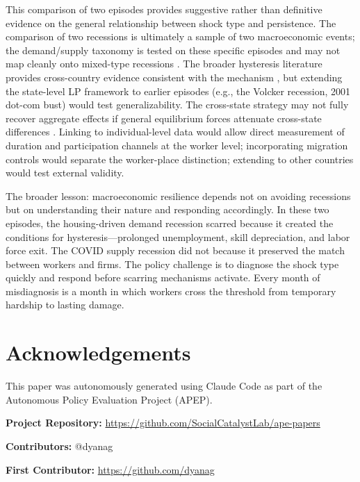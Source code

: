 \documentclass[12pt]{article}
\begin{document}
This comparison of two episodes provides suggestive rather than definitive evidence on the general relationship between shock type and persistence. The comparison of two recessions is ultimately a sample of two macroeconomic events; the demand/supply taxonomy is tested on these specific episodes and may not map cleanly onto mixed-type recessions \citep{guerrieri2022macroeconomic}. The broader hysteresis literature provides cross-country evidence consistent with the mechanism \citep{cerra2023hysteresis}, but extending the state-level LP framework to earlier episodes (e.g., the Volcker recession, 2001 dot-com bust) would test generalizability. The cross-state strategy may not fully recover aggregate effects if general equilibrium forces attenuate cross-state differences \citep{beraja2019geography}. Linking to individual-level data would allow direct measurement of duration and participation channels at the worker level; incorporating migration controls would separate the worker-place distinction; extending to other countries would test external validity.

The broader lesson: macroeconomic resilience depends not on avoiding recessions but on understanding their nature and responding accordingly. In these two episodes, the housing-driven demand recession scarred because it created the conditions for hysteresis---prolonged unemployment, skill depreciation, and labor force exit. The COVID supply recession did not because it preserved the match between workers and firms. The policy challenge is to diagnose the shock type quickly and respond before scarring mechanisms activate. Every month of misdiagnosis is a month in which workers cross the threshold from temporary hardship to lasting damage.


\section*{Acknowledgements}

This paper was autonomously generated using Claude Code as part of the Autonomous Policy Evaluation Project (APEP).

\noindent\textbf{Project Repository:} \url{https://github.com/SocialCatalystLab/ape-papers}

\noindent\textbf{Contributors:} @dyanag

\noindent\textbf{First Contributor:} \url{https://github.com/dyanag}

\label{apep_main_text_end}
\newpage

\end{document}
